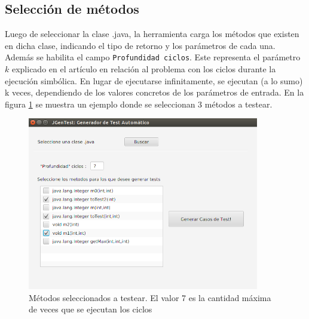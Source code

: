 \documentclass{llncs}
\begin{document}
    \subsection{Selección de métodos}
    Luego de seleccionar la clase .java, la herramienta carga los métodos que existen en dicha clase, indicando el tipo de retorno y los parámetros de cada una.
    Además se habilita el campo \texttt{Profundidad ciclos}. Este representa el parámetro $k$ explicado en el artículo en relación al problema con los ciclos durante
    la ejecución simbólica. En lugar de ejecutarse infinitamente, se ejecutan (a lo sumo) k veces, dependiendo de los valores concretos de los parámetros de entrada.
    En la figura \ref{fig:seleccionaParams} se muestra un ejemplo donde se seleccionan 3 métodos a testear.
    \begin{figure}
    \centering
    \includegraphics[width=0.9\textwidth]{screenshots/2-seleccionMetodos}
    \caption{Métodos seleccionados a testear. El valor 7 es la cantidad máxima de veces que se ejecutan los ciclos }
    \label{fig:seleccionaParams}
    \end{figure}
    
\end{document}
